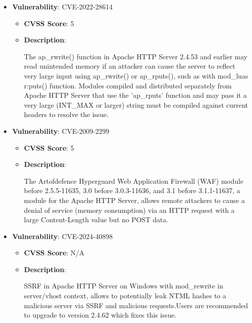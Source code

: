 \documentclass{article}
\begin{document}
\begin{itemize}
        \item \textbf{Vulnerability}: CVE-2022-28614
        \begin{itemize}
            \item \textbf{CVSS Score}:  5 
            \item \textbf{Description}:
            \parbox[t]{0.9\linewidth}{
                \ttfamily The ap\_rwrite() function in Apache HTTP Server 2.4.53 and earlier may read unintended memory if an attacker can cause the server to reflect very large input using ap\_rwrite() or ap\_rputs(), such as with mod\_luas r:puts() function. Modules compiled and distributed separately from Apache HTTP Server that use the 'ap\_rputs' function and may pass it a very large (INT\_MAX or larger) string must be compiled against current headers to resolve the issue.
            }
        \end{itemize}
    
        \item \textbf{Vulnerability}: CVE-2009-2299
        \begin{itemize}
            \item \textbf{CVSS Score}:  5 
            \item \textbf{Description}:
            \parbox[t]{0.9\linewidth}{
                \ttfamily The Artofdefence Hyperguard Web Application Firewall (WAF) module before 2.5.5-11635, 3.0 before 3.0.3-11636, and 3.1 before 3.1.1-11637, a module for the Apache HTTP Server, allows remote attackers to cause a denial of service (memory consumption) via an HTTP request with a large Content-Length value but no POST data.
            }
        \end{itemize}
    
        \item \textbf{Vulnerability}: CVE-2024-40898
        \begin{itemize}
            \item \textbf{CVSS Score}:  N/A 
            \item \textbf{Description}:
            \parbox[t]{0.9\linewidth}{
                \ttfamily SSRF in Apache HTTP Server on Windows with mod\_rewrite in server/vhost context, allows to potentially leak NTML hashes to a malicious server via SSRF and malicious requests.Users are recommended to upgrade to version 2.4.62 which fixes this issue.
            }
        \end{itemize}
    

\end{itemize}
\end{document}
